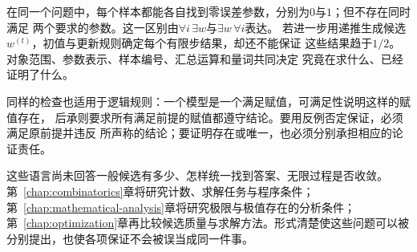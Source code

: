 在同一个问题中，每个样本都能各自找到零误差参数，分别为$0$与$1$；但不存在同时满足
两个要求的参数。这一区别由$\forall i\,\exists w$与$\exists w\,\forall i$表达。
若进一步用递推生成候选$w^{(t)}$，初值与更新规则确定每个有限步结果，却还不能保证
这些结果趋于$1/2$。对象范围、参数表示、样本编号、汇总运算和量词共同决定
究竟在求什么、已经证明了什么。

同样的检查也适用于逻辑规则：一个模型是一个满足赋值，可满足性说明这样的赋值存在，
后承则要求所有满足前提的赋值都遵守结论。要用反例否定保证，必须满足原前提并违反
所声称的结论；要证明存在或唯一，也必须分别承担相应的论证责任。

这些语言尚未回答一般候选有多少、怎样统一找到答案、无限过程是否收敛。
第~\ref{chap:combinatorics}章将研究计数、求解任务与程序条件；
第~\ref{chap:mathematical-analysis}章将研究极限与极值存在的分析条件；
第~\ref{chap:optimization}章再比较候选质量与求解方法。形式清楚使这些问题可以被
分别提出，也使各项保证不会被误当成同一件事。
